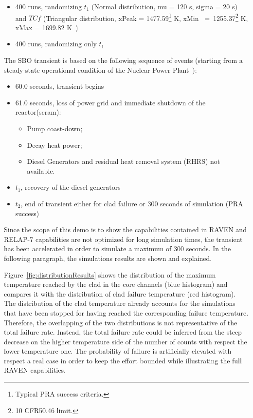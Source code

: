 \documentclass{mc2013}
\begin{document}
 \begin{itemize}
   \item 400 runs, randomizing $t_{1}$ (Normal distribution, mu = 120 s, sigma = 20 s) and $TC{f}$ (Triangular distribution, xPeak = 1477.59\footnote{Typical PRA success criteria.} K, xMin~ =~1255.37\footnote{10 CFR50.46 limit.} K, xMax = 1699.82 K~\cite{Urbanic1978})
   \item 400 runs, randomizing only $t_{1}$
\end{itemize}
The SBO transient is based on the following sequence of events (starting from a steady-state operational condition of the Nuclear Power Plant~\cite{relap7FY12}):
 \begin{itemize}
   \item 60.0 seconds, transient begins
   \item 61.0 seconds, loss of power grid and immediate shutdown of the reactor(scram):
   \begin{itemize}
       \item Pump coast-down;  
       \item Decay heat power;
       \item Diesel Generators and residual heat removal system (RHRS) not available. 
    \end{itemize}
   \item $t_{1}$, recovery of the diesel generators
   \item $t_{2}$, end of transient either for clad failure or 300 seconds of simulation (PRA success)
\end{itemize}
Since the scope of this demo is to show the capabilities contained in RAVEN and RELAP-7 capabilities are not optimized for long simulation times, the transient has been accelerated in order to simulate a maximum of 300 seconds. 
In the following paragraph, the simulations results are shown and explained.

Figure~\ref{fig:distributionResults} shows the distribution of the maximum temperature reached by the clad in the core channels (blue histogram) and compares it with the distribution of clad failure temperature (red histogram).
The distribution of the clad temperature already accounts for the simulations that have been stopped for having reached the corresponding failure temperature. Therefore, the overlapping of the two distributions is not representative of the total failure rate. Instead, the total failure rate could be inferred from the steep decrease on the higher temperature side of the number of counts with respect the lower temperature one. The probability of failure is artificially elevated with respect a real case in order to keep the effort bounded while illustrating the full RAVEN capabilities.
\end{document}
